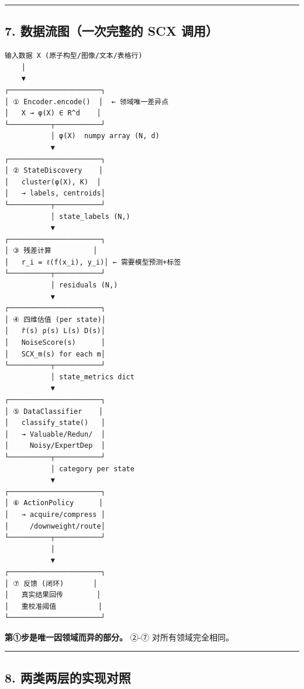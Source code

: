 \documentclass[
  12pt,
]{ctexart}
\begin{document}
\begin{center}\rule{0.5\linewidth}{0.5pt}\end{center}

\subsection{7. 数据流图（一次完整的 SCX
调用）}\label{ux6570ux636eux6d41ux56feux4e00ux6b21ux5b8cux6574ux7684-scx-ux8c03ux7528}

\begin{verbatim}
输入数据 X (原子构型/图像/文本/表格行)
    │
    ▼
┌──────────────────────┐
│ ① Encoder.encode()  │  ← 领域唯一差异点
│   X → φ(X) ∈ R^d    │
└──────────┬───────────┘
           │ φ(X)  numpy array (N, d)
           ▼
┌──────────────────────┐
│ ② StateDiscovery    │
│   cluster(φ(X), K)  │
│   → labels, centroids│
└──────────┬───────────┘
           │ state_labels (N,)
           ▼
┌──────────────────────┐
│ ③ 残差计算          │
│   r_i = ℓ(f(x_i), y_i)│ ← 需要模型预测+标签
└──────────┬───────────┘
           │ residuals (N,)
           ▼
┌──────────────────────┐
│ ④ 四维估值 (per state)│
│   r̄(s) ρ(s) L(s) D(s)│
│   NoiseScore(s)      │
│   SCX_m(s) for each m│
└──────────┬───────────┘
           │ state_metrics dict
           ▼
┌──────────────────────┐
│ ⑤ DataClassifier    │
│   classify_state()   │
│   → Valuable/Redun/  │
│     Noisy/ExpertDep  │
└──────────┬───────────┘
           │ category per state
           ▼
┌──────────────────────┐
│ ⑥ ActionPolicy      │
│   → acquire/compress │
│     /downweight/route│
└──────────┬───────────┘
           │
           ▼
┌──────────────────────┐
│ ⑦ 反馈 (闭环)       │
│   真实结果回传        │
│   重校准阈值          │
└──────────────────────┘
\end{verbatim}

\textbf{第①步是唯一因领域而异的部分。} ②-⑦ 对所有领域完全相同。

\begin{center}\rule{0.5\linewidth}{0.5pt}\end{center}

\subsection{8.
两类两层的实现对照}\label{ux4e24ux7c7bux4e24ux5c42ux7684ux5b9eux73b0ux5bf9ux7167}
\end{document}

